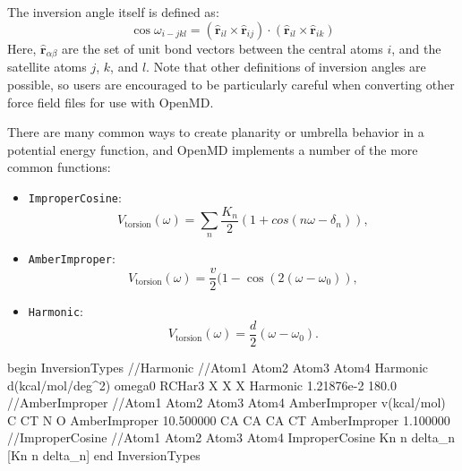 \documentclass[]{book}
\begin{document}
The inversion angle itself is defined as:
\begin{equation}
\cos\omega_{i-jkl} = \left(\hat{\mathbf{r}}_{il} \times
  \hat{\mathbf{r}}_{ij}\right)\cdot\left( \hat{\mathbf{r}}_{il} \times
  \hat{\mathbf{r}}_{ik}\right)
\end{equation}
Here, $\hat{\mathbf{r}}_{\alpha\beta}$ are the set of unit bond
vectors between the central atoms $i$, and the satellite atoms $j$,
$k$, and $l$.  Note that other definitions of inversion angles are
possible, so users are encouraged to be particularly careful when
converting other force field files for use with OpenMD.

There are many common ways to create planarity or umbrella behavior in
a potential energy function, and OpenMD implements a number of the
more common functions:
\begin{itemize}
\item {\tt ImproperCosine}:
\begin{equation*}
V_{\text{torsion}}(\omega) = \sum_n \frac{K_n}{2} \left( 1 + cos(n
  \omega - \delta_n) \right),
\end{equation*}
\item {\tt AmberImproper}:
\begin{equation*}
  V_{\text{torsion}}(\omega) =  \frac{v}{2} (1 - \cos\left(2 \left(\omega - \omega_0\right)\right),
\end{equation*}
\item {\tt Harmonic}:
\begin{equation*}
V_{\text{torsion}}(\omega) =  \frac{d}{2} \left(\omega - \omega_0\right).
\end{equation*}
\end{itemize}
\begin{code}[caption={[An example of an InversionTypes block.] A
simple example of a InversionTypes block.  Angles ($\delta_n$ and
$\omega_0$) angles are given in degrees, while energy parameters ($v,
K_n$) are given in kcal / mol.   The Harmonic Inversion type has a
force constant that must be given in kcal/mol/degrees$^2$.},
label={sch:InversionTypes}]
begin InversionTypes
//Harmonic
//Atom1 Atom2   Atom3   Atom4   Harmonic  d(kcal/mol/deg^2)  omega0
RCHar3  X       X       X       Harmonic  1.21876e-2         180.0
//AmberImproper
//Atom1 Atom2   Atom3   Atom4   AmberImproper   v(kcal/mol)
C       CT      N       O       AmberImproper   10.500000
CA      CA      CA      CT      AmberImproper   1.100000 
//ImproperCosine
//Atom1 Atom2   Atom3   Atom4   ImproperCosine  Kn  n  delta_n  [Kn n delta_n]
end InversionTypes
\end{code}
\end{document}
